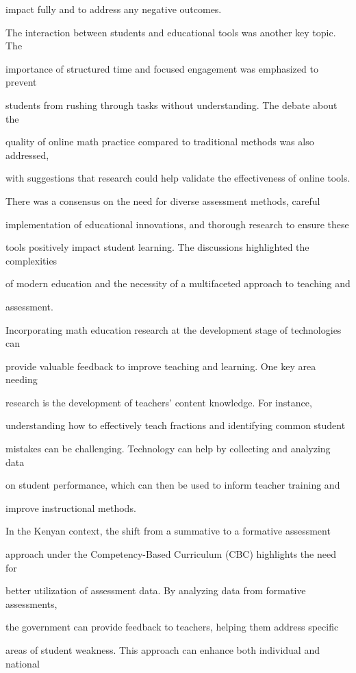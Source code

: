\documentclass[11pt]{article}
\begin{document}
impact fully and to address any negative outcomes.

The interaction between students and educational tools was another key topic. The

importance of structured time and focused engagement was emphasized to prevent

students from rushing through tasks without understanding. The debate about the

quality of online math practice compared to traditional methods was also addressed,

with suggestions that research could help validate the effectiveness of online tools.

There was a consensus on the need for diverse assessment methods, careful

implementation of educational innovations, and thorough research to ensure these

tools positively impact student learning. The discussions highlighted the complexities

of modern education and the necessity of a multifaceted approach to teaching and

assessment.

Incorporating math education research at the development stage of technologies can

provide valuable feedback to improve teaching and learning. One key area needing

research is the development of teachers' content knowledge. For instance,

understanding how to effectively teach fractions and identifying common student

mistakes can be challenging. Technology can help by collecting and analyzing data

on student performance, which can then be used to inform teacher training and

improve instructional methods.

In the Kenyan context, the shift from a summative to a formative assessment

approach under the Competency-Based Curriculum (CBC) highlights the need for

better utilization of assessment data. By analyzing data from formative assessments,

the government can provide feedback to teachers, helping them address specific

areas of student weakness. This approach can enhance both individual and national
\end{document}
